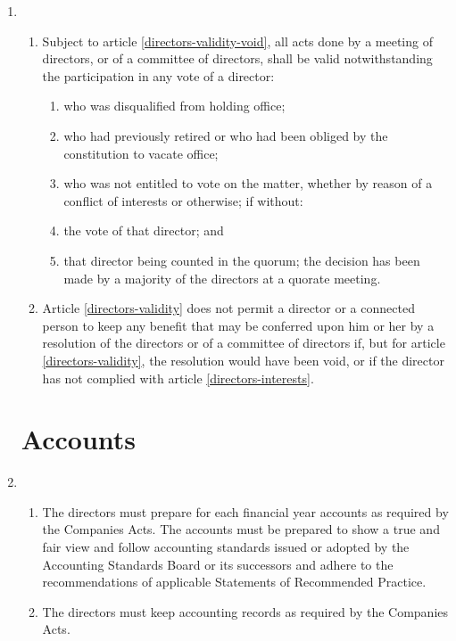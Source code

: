\begin{enumerate}
\item
  \begin{enumerate}
  \item \label{directors-validity}
    Subject to article \ref{directors-validity-void}, all acts done by a meeting of directors,
    or of a committee of directors, shall be valid notwithstanding the
    participation in any vote of a director:
    \begin{enumerate}
    \item
      who was disqualified from holding office;
    \item
      who had previously retired or who had been obliged by the
      constitution to vacate office;
    \item
      who was not entitled to vote on the matter, whether by reason of a
      conflict of interests or otherwise; if without:
    \item
      the vote of that director; and
    \item
      that director being counted in the quorum; the decision has been
      made by a majority of the directors at a quorate meeting.
    \end{enumerate}
  \item \label{directors-validity-void}
    Article \ref{directors-validity} does not permit a director or a connected person to
    keep any benefit that may be conferred upon him or her by a
    resolution of the directors or of a committee of directors if, but
    for article \ref{directors-validity}, the resolution would have been void, or if the
    director has not complied with article \ref{directors-interests}.
  \end{enumerate}

\section{Accounts}

\item
  \begin{enumerate}
  \item
    The directors must prepare for each financial year accounts as
    required by the Companies Acts. The accounts must be prepared to
    show a true and fair view and follow accounting standards issued or
    adopted by the Accounting Standards Board or its successors and
    adhere to the recommendations of applicable Statements of
    Recommended Practice.
  \item
    The directors must keep accounting records as required by the
    Companies Acts.
  \end{enumerate}


\end{enumerate}
